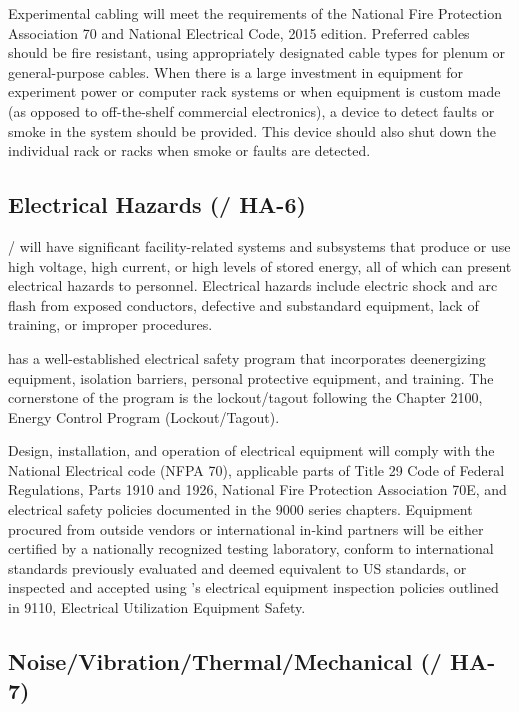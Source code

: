 Experimental cabling will meet the requirements of the National Fire
Protection Association 70 and National Electrical Code, 2015 edition.
Preferred cables should be fire resistant, using appropriately
designated cable types for plenum or general-purpose cables.  When
there is a large investment in equipment for experiment power or
computer rack systems or when equipment is custom made (as opposed to
off-the-shelf commercial electronics), a device to detect faults or
smoke in the system should be provided.  This device should also shut
down the individual rack or racks when smoke or faults are detected.


\subsection{Electrical Hazards (/ HA-6)}

/ will have significant facility-related
systems and subsystems that produce or use high voltage, high current,
or high levels of stored energy, all of which can present electrical
hazards to personnel. Electrical hazards include electric shock and
arc flash from exposed conductors, defective and substandard
equipment, lack of training, or improper procedures.

\fnal has a well-established electrical safety program that
incorporates deenergizing equipment, isolation barriers, personal
protective equipment, and training. The cornerstone of the program is
the lockout/tagout following the  Chapter 2100, \fnal
Energy Control Program (Lockout/Tagout).

Design, installation, and operation of electrical equipment will
comply with the National Electrical code (NFPA 70), applicable parts
of Title 29 Code of Federal Regulations, Parts 1910 and 1926, National
Fire Protection Association 70E, and \fnal electrical safety policies
documented in the  9000 series chapters. Equipment
procured from outside vendors or international in-kind partners will
be either certified by a nationally recognized testing laboratory,
conform to international standards previously evaluated and deemed
equivalent to US standards, or inspected and accepted using \fnal's
electrical equipment inspection policies outlined in 
9110, Electrical Utilization Equipment Safety.


\subsection{Noise/Vibration/Thermal/Mechanical (/ HA-7)}


